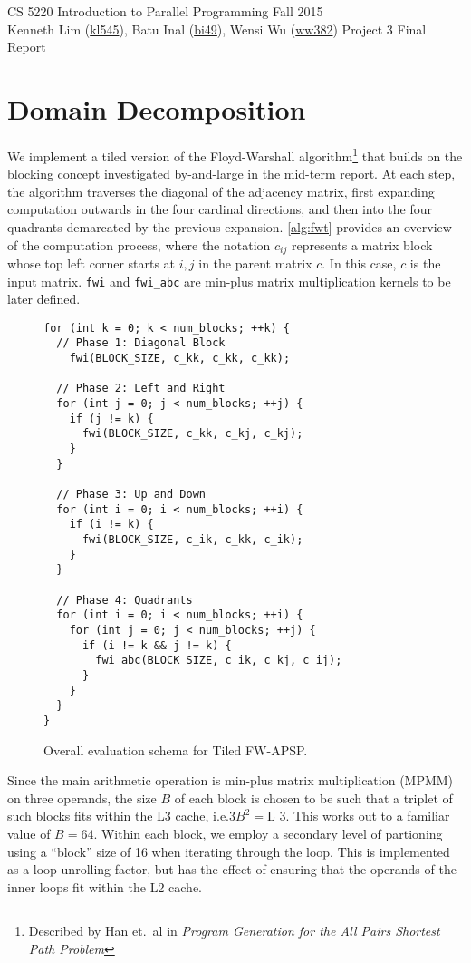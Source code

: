\documentclass{scrartcl}
\begin{document}
  \begin{framed}
  CS 5220 Introduction to Parallel Programming \hfill Fall 2015 \\
  Kenneth Lim (\href{mailto:kl545@cornell.edu}{kl545}), Batu Inal (\href{mailto:bi49@cornell.edu}{bi49}), Wensi Wu (\href{mailto:ww382@cornell.edu}{ww382}) \hfill Project 3 Final Report\hspace{-3ex}
  \end{framed}
  \section{Domain Decomposition}
  We implement a tiled version of the Floyd-Warshall algorithm\footnote{Described by Han et.~al in \emph{Program Generation for the All Pairs Shortest Path Problem}} that builds on the blocking concept investigated by-and-large in the mid-term report. At each step, the algorithm traverses the diagonal of the adjacency matrix, first expanding computation outwards in the four cardinal directions, and then into the four quadrants demarcated by the previous expansion. \autoref{alg:fwt} provides an overview of the computation process, where the notation $c_{ij}$ represents a matrix block whose top left corner starts at $i, j$ in the parent matrix $c$. In this case, $c$ is the input matrix. \texttt{fwi} and \texttt{fwi\_abc} are min-plus matrix multiplication kernels to be later defined.

  \begin{figure}[ht!]
    \begin{lstlisting}
for (int k = 0; k < num_blocks; ++k) {
  // Phase 1: Diagonal Block
    fwi(BLOCK_SIZE, c_kk, c_kk, c_kk);

  // Phase 2: Left and Right
  for (int j = 0; j < num_blocks; ++j) {
    if (j != k) {
      fwi(BLOCK_SIZE, c_kk, c_kj, c_kj);
    }
  }

  // Phase 3: Up and Down
  for (int i = 0; i < num_blocks; ++i) {
    if (i != k) {
      fwi(BLOCK_SIZE, c_ik, c_kk, c_ik);
    }
  }

  // Phase 4: Quadrants
  for (int i = 0; i < num_blocks; ++i) {
    for (int j = 0; j < num_blocks; ++j) {
      if (i != k && j != k) {
        fwi_abc(BLOCK_SIZE, c_ik, c_kj, c_ij);
      }
    }
  }
}
    \end{lstlisting}
    \caption{Overall evaluation schema for Tiled FW-APSP.\label{alg:fwt}}
  \end{figure}

  Since the main arithmetic operation is min-plus matrix multiplication (MPMM) on three operands, the size $B$ of each block is chosen to be such that a triplet of such blocks fits within the L3 cache, i.e.$3B^2 = \textrm{L_3}$. This works out to a familiar value of $B = 64$. Within each block, we employ a secondary level of partioning using a ``block'' size of 16 when iterating through the loop. This is implemented as a loop-unrolling factor, but has the effect of ensuring that the operands of the inner loops fit within the L2 cache.
\end{document}
